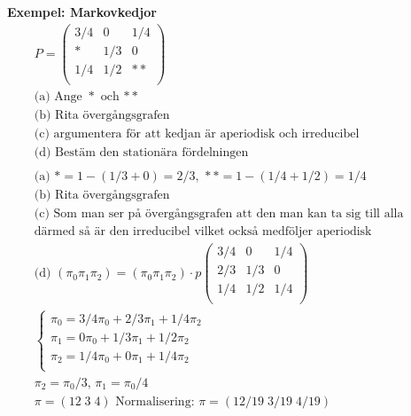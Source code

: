 \textbf{Exempel: Markovkedjor}
\begin{align*}
  &\quad  P=
   \left(\begin{array}{ccc}
    3/4 & 0 & 1/4 \\
    * & 1/3 & 0 \\
    1/4 & 1/2 & ** \\
  \end{array}\right) \\
  &\quad  \text{(a) Ange $*$ och $**$} \\
  &\quad  \text{(b) Rita övergångsgrafen} \\
  &\quad  \text{(c) argumentera för att kedjan är aperiodisk och irreducibel} \\
  &\quad  \text{(d) Bestäm den stationära fördelningen} \\
  &\quad  \\
  &\quad  \text{(a) } *=1 -(1/3+0) = 2/3, \, **= 1-(1/4+1/2)=1/4 \\
  &\quad  \text{(b) Rita övergångsgrafen} \\
  &\quad  \text{(c) Som man ser på övergångsgrafen att den man kan ta sig till alla posistioner} \\
  &\quad  \text{därmed så är den irreducibel vilket också medföljer aperiodisk} \\
  &\quad  \text{(d) } (\pi_0 \pi_1 \pi_2) = (\pi_0 \pi_1 \pi_2)\cdot{p}
   \left(\begin{array}{ccc}
    3/4 & 0 & 1/4 \\
    2/3 & 1/3 & 0 \\
    1/4 & 1/2 & 1/4 \\
  \end{array}\right) \\
  &\quad \left\{\begin{array}{rr}
  \pi_0 = 3/4\pi_0 + 2/3\pi_1 + 1/4\pi_2 \\
  \pi_1 = 0\pi_0 + 1/3\pi_1 + 1/2\pi_2 \\
  \pi_2 = 1/4\pi_0 + 0\pi_1 + 1/4\pi_2 \\
  \end{array}\right. \\
  &\quad  \pi_2=\pi_0/3, \, \pi_1=\pi_0/4 \\
  &\quad  \pi = (12 \; 3 \; 4) \text{ Normalisering: } \pi = (12/19 \; 3/19 \; 4/19) \\
\end{align*}

